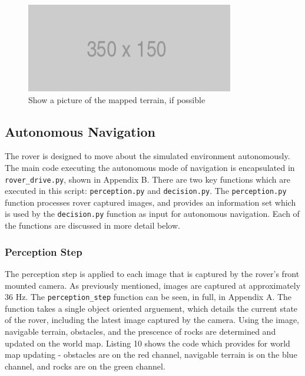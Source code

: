 \documentclass[a4paper]{article}
\begin{document}
\begin{figure}[h]
\centering
\includegraphics[scale=0.5]{placeholder}
\caption{Show a picture of the mapped terrain, if possible}
\end{figure}

\newpage

\subsection{Autonomous Navigation}
The rover is designed to move about the simulated environment autonomously. The main code executing the autonomous mode of navigation is encapsulated in \verb|rover_drive.py|, shown in Appendix B. There are two key functions which are executed in this script: \verb|perception.py| and \verb|decision.py|. The \verb|perception.py| function processes rover captured images, and provides an information set which is used by the \verb|decision.py| function as input for autonomous navigation. Each of the functions are discussed in more detail below.

\subsubsection{Perception Step}
The perception step is applied to each image that is captured by the rover's front mounted camera. As previously mentioned, images are captured at approximately 36 $\si{\hertz}$. The \verb|perception_step| function can be seen, in full, in Appendix A. The function takes a single object oriented arguement, which details the current state of the rover, including the latest image captured by the camera. Using the image, navigable terrain, obstacles, and the prescence of rocks are determined and updated on the world map. Listing 10 shows the code which provides for world map updating - obstacles are on the red channel, navigable terrain is on the blue channel, and rocks are on the green channel.
\end{document}
